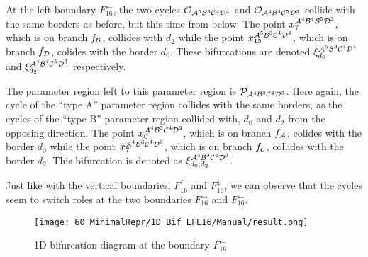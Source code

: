 At the left boundary $F_{16}^\leftarrow$, the two cycles $\mathcal{O}_{\mathcal{A}^5\mathcal{B}^3\mathcal{C}^4\mathcal{D}^4}$ and $\mathcal{O}_{\mathcal{A}^4\mathcal{B}^4\mathcal{C}^5\mathcal{D}^3}$ collide with the same borders as before, but this time from below.
The point $x_{7}^{\mathcal{A}^4\mathcal{B}^4\mathcal{B}^5\mathcal{D}^3}$, which is on branch $f_{\mathcal{B}}$, collides with $d_2$ while the point $x_{15}^{\mathcal{A}^5\mathcal{B}^3\mathcal{C}^4\mathcal{D}^4}$, which is on branch $f_{\mathcal{D}}$, colides with the border $d_0$.
These bifurcations are denoted $\xi_{d_0}^{\mathcal{A}^5\mathcal{B}^3\mathcal{C}^4\mathcal{D}^4}$ and $\xi_{d_2}^{\mathcal{A}^4\mathcal{B}^4\mathcal{C}^5\mathcal{D}^3}$ respectively.

The parameter region left to this parameter region is $\mathcal{P}_{\mathcal{A}^4\mathcal{B}^3\mathcal{C}^4\mathcal{D}^3}$.
Here again, the cycle of the ``type A'' parameter region collides with the same borders, as the cycles of the ``type B'' parameter region collided with, $d_0$ and $d_2$ from the opposing direction.
The point $x_{0}^{\mathcal{A}^4\mathcal{B}^3\mathcal{C}^4\mathcal{D}^3}$, which is on branch $f_{\mathcal{A}}$, colides with the border $d_0$ while the point $x_{7}^{\mathcal{A}^4\mathcal{B}^3\mathcal{C}^4\mathcal{D}^3}$, which is on branch $f_{\mathcal{C}}$, collides with the border $d_2$.
This bifurcation is denoted as $\xi_{d_0, d_2}^{\mathcal{A}^4\mathcal{B}^3\mathcal{C}^4\mathcal{D}^3}$.

Just like with the vertical boundaries, $F_{16}^\uparrow$ and $F_{16}^\downarrow$, we can observe that the cycles seem to switch roles at the two boundaries $F_{16}^\rightarrow$ and $F_{16}^\leftarrow$.

\begin{figure}
    \centering
    \texttt{[image: 60\_MinimalRepr/1D\_Bif\_LFL16/Manual/result.png]}
    \label{fig:final.bifurcation.F.left}
    \caption{1D bifurcation diagram at the boundary $F_{16}^\leftarrow$}
\end{figure}



